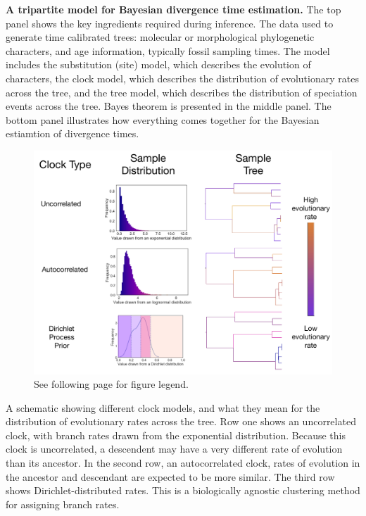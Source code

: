 \documentclass[11pt]{article}
\begin{document}
\clearpage

\caption{\footnotesize \textbf{A tripartite model for Bayesian divergence time estimation.}
The top panel shows the key ingredients required during inference.
The data used to generate time calibrated trees: molecular or morphological phylogenetic characters, and age information, typically fossil sampling times.
The model includes the substitution (site) model, which describes the evolution of characters, the clock model, which describes the distribution of evolutionary rates across the tree, and the tree model, which describes the distribution of speciation events across the tree.
Bayes theorem is presented in the middle panel. 
The bottom panel illustrates how everything comes together for the Bayesian estiamtion of divergence times.
}

\clearpage



\begin{figure}
\centering
\includegraphics[width=\textwidth]{figures/Distributions.pdf}
\caption{\footnotesize See following page for figure legend.
}
\label{fig:distn}
\end{figure}

\caption{\footnotesize A schematic showing different clock models, and what they mean for the distribution of evolutionary rates across the tree. Row one shows an uncorrelated clock, with branch rates drawn from the exponential distribution. Because this clock is uncorrelated, a descendent may have a very different rate of evolution than its ancestor. In the second row, an autocorrelated clock, rates of evolution in the ancestor and descendant are expected to be more similar. The third row shows Dirichlet-distributed rates. This is a biologically agnostic clustering method for assigning branch rates.
}
\end{document}
